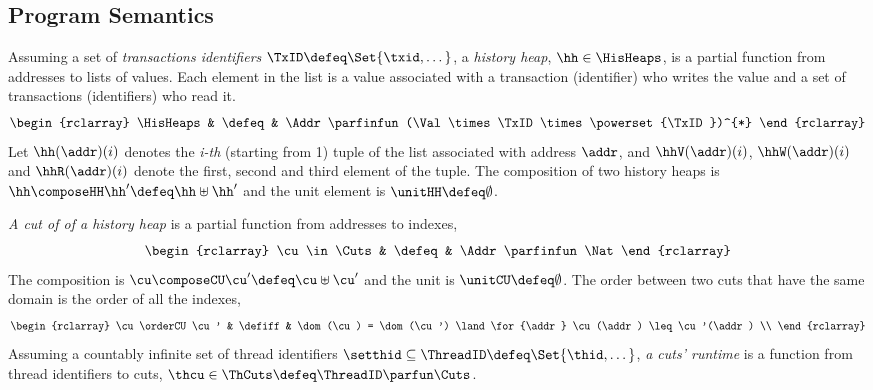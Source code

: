 \subsection{Program Semantics}
\begin{defn}
\label{def:his_heap}
Assuming a set of \emph{transactions identifiers} \( \TxID \defeq \Set{\txid, \dots}\), a \emph{history heap}, \( \hh \in \HisHeaps \), is a partial function from addresses to lists of values.
Each element in the list is a value associated with a transaction (identifier) who writes the value and a set of transactions (identifiers) who read it.
\[
\begin{rclarray}
    \HisHeaps & \defeq & \Addr \parfinfun (\Val \times \TxID \times \powerset{\TxID})^{*}
\end{rclarray}
\]
Let \( \hh(\addr)(i)\) denotes the \emph{i-th} (starting from 1) tuple of the list associated with address \( \addr \), and \( \hhV(\addr)(i) \), \( \hhW(\addr)(i) \) and \( \hhR(\addr)(i) \) denote the first, second and third element of the tuple.
The composition of two history heaps is \( \hh \composeHH \hh' \defeq \hh \uplus \hh' \) and the unit element is \( \unitHH \defeq \emptyset \). 
\end{defn}



\begin{defn}
\label{def:cuts}
\emph{A cut of of a history heap} is a partial function from addresses to indexes,
\[
\begin{rclarray}
    \cu \in \Cuts & \defeq & \Addr \parfinfun \Nat
\end{rclarray}
\]                                                                     
The composition is \( \cu \composeCU \cu' \defeq \cu \uplus \cu'\) and the unit is \( \unitCU \defeq \emptyset\).
The order between two cuts that have the same domain is the order of all the indexes, 
\[
\begin{rclarray}
    \cu \orderCU \cu' & \defiff & \dom(\cu) = \dom(\cu') \land \for{\addr} \cu(\addr) \leq \cu'(\addr) \\
\end{rclarray}
\]
Assuming a countably infinite set of thread identifiers \( \setthid \subseteq \ThreadID \defeq \Set{\thid, \dots} \), \emph{a cuts' runtime} is a function from thread identifiers to cuts, \ie \( \thcu \in \ThCuts \defeq \ThreadID \parfun \Cuts\).
\end{defn}

